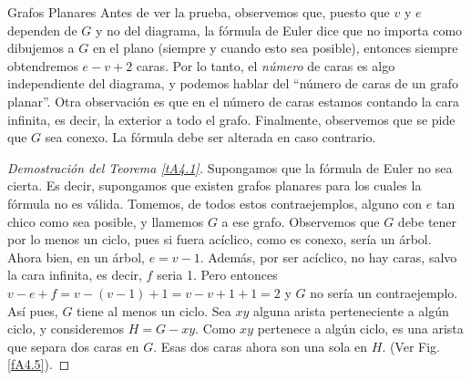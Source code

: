 \documentclass[11pt,spanish,makeidx]{amsbook}
\theoremstyle{definition}
\theoremstyle{remark}
\begin{document}
\begin{section}{Grafos Planares}
Antes de ver la prueba, observemos que, puesto que $v$ y $e$
dependen de $G$ y no del diagrama, la fórmula de Euler dice que no
importa como dibujemos a $G$ en el plano (siempre y cuando esto
sea posible), entonces siempre obtendremos $e-v+2$ caras. Por lo
tanto, el {\it número} de caras es algo independiente del
diagrama, y podemos hablar del ``número de caras de un grafo
planar''. Otra observación es que en el número de caras estamos
contando la cara infinita, es decir, la exterior a todo el grafo.
Finalmente, observemos que se pide que $G$ sea conexo. La fórmula
debe ser alterada en caso contrario.

\begin{proof}[Demostración del Teorema \ref{tA4.1}]
Supongamos que la fórmula de Euler no sea cierta. Es decir,
supongamos que existen grafos planares para los cuales la fórmula
no es válida. Tomemos, de todos estos contraejemplos, alguno con
$e$ tan chico como sea posible, y llamemos $G$ a ese grafo.
Observemos que $G$ debe tener por lo menos un ciclo, pues si fuera
acíclico, como es conexo, sería un árbol. Ahora bien, en un árbol,
$e=v-1$. Además, por ser acíclico, no hay caras, salvo la cara
infinita, es decir, $f$ seria 1. Pero entonces
$v-e+f=v-(v-1)+1=v-v+1+1=2$ y $G$ no sería un contraejemplo. Así
pues, $G$ tiene al menos un ciclo. Sea $xy$ alguna arista
perteneciente a algún ciclo, y consideremos $H=G-xy$. Como $xy$
pertenece a algún ciclo, es una arista que separa dos caras en
$G$. Esas dos caras ahora son una sola en $H$. (Ver Fig.
\ref{fA4.5}).


\end{proof}
\end{section}
\end{document}
